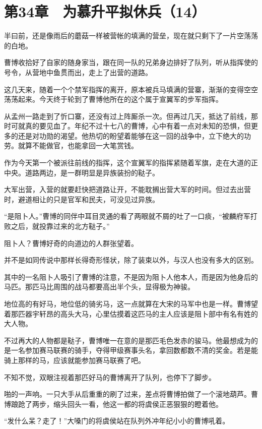 \section{第34章　为慕升平拟休兵（14）}

半曰前，还是像雨后的蘑菇一样被营帐的填满的营垒，现在就只剩下了一片空荡荡的白地。

曹博收拾好了自家的随身家当，跟在同一队的兄弟身边排好了队列，听从指挥使的号令，从营地中鱼贯而出，走上了出营的道路。

这几天来，随着一个个禁军指挥的离开，原本被兵马填满的营寨，渐渐的变得空空荡荡起来。今天终于轮到了曹博他所在的这个属于宣翼军的步军指挥。

从孟州一路走到了忻口寨，还没有过上阵厮杀一次。但再过几天，抵达了前线，那时可就真的要见血了。年纪不过十七八的曹博，心中有着一点对未知的恐惧，但更多的还是对功勋的渴望。他热切的盼望着能够在这一回的战争中，立下绝大的功劳。就算不能做官，也能拿回一大笔赏钱。

作为今天第一个被派往前线的指挥，这个宣翼军的指挥紧随着军旗，走在大道的正中央。道路两边，是一群明显是异族装扮的鞑子。

大军出营，入营的就要赶快把道路让开，不能耽搁出营大军的时间。但过去出营时，避道相让的只是官军和民夫，可没见过异族。

“是阻卜人。”曹博的同伴中耳目灵通的看了两眼就不屑的吐了一口痰，“被麟府军打败之后，就投靠过来的北方鞑子。”

阻卜人？曹博好奇的向道边的人群张望着。

并不是如同传说中那样长得奇形怪状，除了装束以外，与汉人也没有多大的区别。

其中的一名阻卜人吸引了曹博的注意，不是因为阻卜人他本人，而是因为他身后的马匹。那匹马比周围的战马都要高出半个头，显得极为神骏。

地位高的有好马，地位低的骑劣马，这一点就算在大宋的马军中也是一样。曹博望着那匹器宇轩昂的高头大马，心里估摸着这匹马的主人应该是阻卜部中有名有姓的大人物。

不过再大的人物都是鞑子，曹博唯一在意的是那匹毛色发赤的骏马。他最想成为的是一名参加赛马联赛的骑手，夺得甲级赛事头名，拿回数都数不清的奖金。若是能骑上那样的马，应该就能参加赛马联赛了吧。

不知不觉，双眼注视着那匹好马的曹博离开了队列，也停下了脚步。

啪的一声响。一只大手从后重重的刷了过来，差点将曹博拍做了一个滚地葫芦。曹博踉跄了两步，缩头回头一看，他这一都的将虞侯正恶狠狠的瞪着他。

“发什么呆？走了！”大嗓门的将虞侯站在队列外冲年纪小小的曹博吼着。

